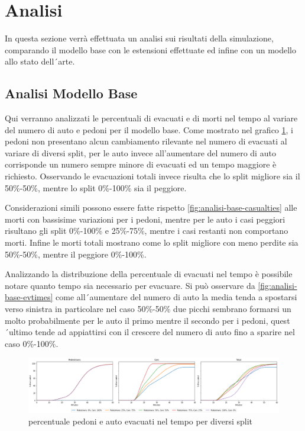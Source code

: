 \newpage


\section{Analisi}
\label{sec:analisi}
In questa sezione verrà effettuata un analisi sui risultati della simulazione, comparando il modello base con le estensioni effettuate ed infine con un modello allo stato dell´arte.

\subsection{Analisi Modello Base}
Qui verranno analizzati le percentuali di evacuati e di morti nel tempo al variare del numero di auto e pedoni per il modello base.
Come mostrato nel grafico \ref*{fig:analisi-base-evacuated}, i pedoni non presentano alcun 
cambiamento rilevante nel numero di evacuati al variare di diversi split, 
per le auto invece all'aumentare del numero di auto corrisponde un numero sempre minore di evacuati ed un tempo maggiore è richiesto.
Osservando le evacuazioni totali invece risulta che lo split migliore sia il 50\%-50\%, mentre lo split 0\%-100\% sia il peggiore.

Considerazioni simili possono essere fatte rispetto \ref*{fig:analisi-base-casualties} alle morti con bassisime variazioni per i pedoni,
mentre per le auto i casi peggiori risultano gli split 0\%-100\% e 25\%-75\%, mentre i casi restanti non comportano morti.
Infine le morti totali mostrano come lo split migliore con meno perdite sia 50\%-50\%, mentre il peggiore 0\%-100\%.

Analizzando la distribuzione della percentuale di evacuati nel tempo è possibile notare quanto tempo sia necessario per evacuare.
Si può osservare da \ref*{fig:analisi-base-evtimes} come all´aumentare del numero di auto la media tenda a spostarsi verso sinistra
in particolare nel caso 50\%-50\% due picchi sembrano formarsi un molto probabilmente
per le auto il primo mentre il secondo per i pedoni, quest´ultimo tende ad appiattirsi con il crescere del numero di auto fino a sparire nel caso 0\%-100\%.

\begin{figure}[ht]
    \centering
    \includegraphics[width=\textwidth]{images/analisi/base-evacuated.png}
    \caption{percentuale pedoni e auto evacuati nel tempo per diversi split}
    \label{fig:analisi-base-evacuated}
\end{figure}

